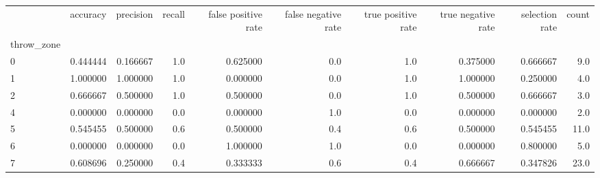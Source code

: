 \begin{tabular}{lrrrrrrrrr}
\toprule
{} &  accuracy &  precision &  recall &  false positive rate &  false negative rate &  true positive rate &  true negative rate &  selection rate &  count \\
throw\_zone &           &            &         &                      &                      &                     &                     &                 &        \\
\midrule
0          &  0.444444 &   0.166667 &     1.0 &             0.625000 &                  0.0 &                 1.0 &            0.375000 &        0.666667 &    9.0 \\
1          &  1.000000 &   1.000000 &     1.0 &             0.000000 &                  0.0 &                 1.0 &            1.000000 &        0.250000 &    4.0 \\
2          &  0.666667 &   0.500000 &     1.0 &             0.500000 &                  0.0 &                 1.0 &            0.500000 &        0.666667 &    3.0 \\
4          &  0.000000 &   0.000000 &     0.0 &             0.000000 &                  1.0 &                 0.0 &            0.000000 &        0.000000 &    2.0 \\
5          &  0.545455 &   0.500000 &     0.6 &             0.500000 &                  0.4 &                 0.6 &            0.500000 &        0.545455 &   11.0 \\
6          &  0.000000 &   0.000000 &     0.0 &             1.000000 &                  1.0 &                 0.0 &            0.000000 &        0.800000 &    5.0 \\
7          &  0.608696 &   0.250000 &     0.4 &             0.333333 &                  0.6 &                 0.4 &            0.666667 &        0.347826 &   23.0 \\
\bottomrule
\end{tabular}
